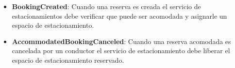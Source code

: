 \begin{itemize}
    \item \textbf{BookingCreated}: Cuando una reserva es creada el servicio de estacionamientos debe verificar que puede ser acomodada y asignarle un espacio de estacionamiento.
    \item \textbf{AccommodatedBookingCanceled}: Cuando una reserva acomodada es cancelada por un conductor el servicio de estacionamiento debe liberar el espacio de estacionamiento reservado.
\end{itemize}




